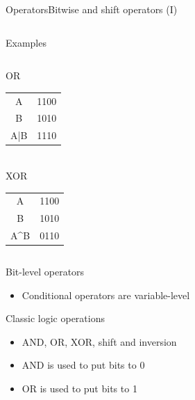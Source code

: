 \documentclass[10pt,compress]{beamer} %
\begin{document}
\begin{frame}{Operators}{Bitwise and shift operators (I)}
\begin{columns}
\begin{block}{Examples}
\begin{columns}
		\begin{center}
		OR
		\footnotesize{
		\begin{tabular}{|c|c|}\hline
		A  &1100 \\
		B  &1010 \\
		A|B&1110 \\\hline
		\end{tabular}\\
		\normalsize{XOR}
		\footnotesize{
		\centering \begin{tabular}{|c|c|}\hline
		A  		&1100 \\
		B  		&1010 \\
		A\^{}B	&0110 \\\hline
		\end{tabular}
		}
		}
		\end{center}
		\end{columns}
		\end{block}
	\end{columns}

	Bit-level operators
		\begin{itemize}
		\item Conditional operators are variable-level
		\end{itemize}
	Classic logic operations
		\begin{itemize}
		\item AND, OR, XOR, shift and inversion
		\item AND is used to put bits to 0
		\item OR is used to put bits to 1
		\end{itemize}
\end{frame}
\end{document}
